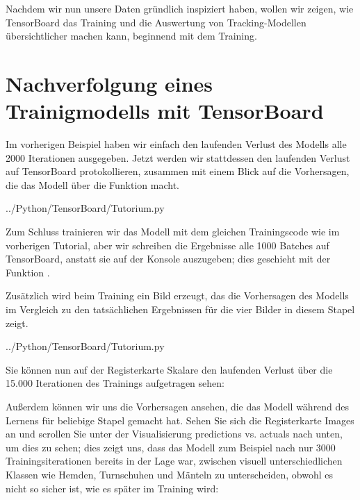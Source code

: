 
Nachdem wir nun unsere Daten gründlich inspiziert haben, wollen wir zeigen, wie TensorBoard das Training und die Auswertung von Tracking-Modellen übersichtlicher machen kann, beginnend mit dem Training.

\section{Nachverfolgung eines Trainigmodells mit TensorBoard}

Im vorherigen Beispiel haben wir einfach den laufenden Verlust des Modells alle 2000 Iterationen ausgegeben. Jetzt werden wir stattdessen den laufenden Verlust auf TensorBoard protokollieren, zusammen mit einem Blick auf die Vorhersagen, die das Modell über die Funktion  macht.


{../Python/TensorBoard/Tutorium.py}

Zum Schluss trainieren wir das Modell mit dem gleichen Trainingscode wie im vorherigen Tutorial, aber wir schreiben die Ergebnisse alle 1000 Batches auf TensorBoard, anstatt sie auf der Konsole auszugeben; dies geschieht mit der Funktion .

\bigskip

Zusätzlich wird beim Training ein Bild erzeugt, das die Vorhersagen des Modells im Vergleich zu den tatsächlichen Ergebnissen für die vier Bilder in diesem Stapel zeigt.


{../Python/TensorBoard/Tutorium.py}

Sie können nun auf der Registerkarte Skalare den laufenden Verlust über die 15.000 Iterationen des Trainings aufgetragen sehen:


Außerdem können wir uns die Vorhersagen ansehen, die das Modell während des Lernens für beliebige Stapel gemacht hat. Sehen Sie sich die Registerkarte \glqq Images\grqq{} an und scrollen Sie unter der Visualisierung \glqq predictions vs. actuals\grqq{}{} nach unten, um dies zu sehen; dies zeigt uns, dass das Modell zum Beispiel nach nur 3000 Trainingsiterationen bereits in der Lage war, zwischen visuell unterschiedlichen Klassen wie Hemden, Turnschuhen und Mänteln zu unterscheiden, obwohl es nicht so sicher ist, wie es später im Training wird:

